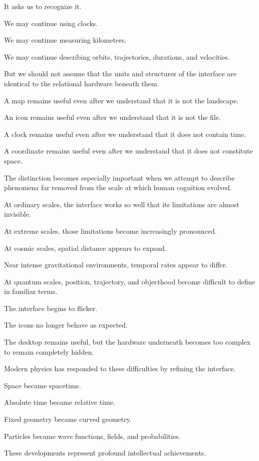 It asks us to recognize it.

We may continue using clocks.

We may continue measuring kilometers.

We may continue describing orbits, trajectories, durations, and velocities.

But we should not assume that the units and structures of the interface are identical to the relational hardware beneath them.

A map remains useful even after we understand that it is not the landscape.

An icon remains useful even after we understand that it is not the file.

A clock remains useful even after we understand that it does not contain time.

A coordinate remains useful even after we understand that it does not constitute space.

The distinction becomes especially important when we attempt to describe phenomena far removed from the scale at which human cognition evolved.

At ordinary scales, the interface works so well that its limitations are almost invisible.

At extreme scales, those limitations become increasingly pronounced.

At cosmic scales, spatial distance appears to expand.

Near intense gravitational environments, temporal rates appear to differ.

At quantum scales, position, trajectory, and objecthood become difficult to define in familiar terms.

The interface begins to flicker.

The icons no longer behave as expected.

The desktop remains useful, but the hardware underneath becomes too complex to remain completely hidden.

Modern physics has responded to these difficulties by refining the interface.

Space became spacetime.

Absolute time became relative time.

Fixed geometry became curved geometry.

Particles became wave functions, fields, and probabilities.

These developments represent profound intellectual achievements.

